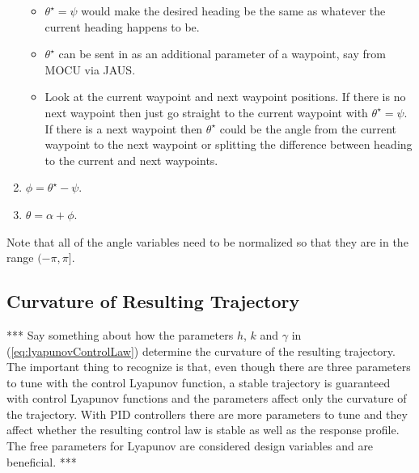 \begin{enumerate}
\begin{itemize}
\item $\theta^\star=\psi$ would make the desired heading be the same as whatever the current heading happens to be.
\item $\theta^\star$ can be sent in as an additional parameter of a waypoint, say from MOCU via JAUS.
\item Look at the current waypoint and next waypoint positions. If there is no next waypoint then just go straight to the current waypoint with $\theta^\star=\psi$. If there is a next waypoint then $\theta^\star$ could be the angle from the current waypoint to the next waypoint or splitting the difference between heading to the current and next waypoints.
\end{itemize}
\item $\phi=\theta^\star-\psi$.
\item $\theta=\alpha + \phi$.
\end{enumerate}
Note that all of the angle variables need to be normalized so that they are in the range $(-\pi,\pi]$.

\subsection{Curvature of Resulting Trajectory}
\label{sec:trajectoryCurvature}
*** Say something about how the parameters $h$, $k$ and $\gamma$ in (\ref{eq:lyapunovControlLaw}) determine the curvature of the resulting trajectory. The important thing to recognize is that, even though there are three parameters to tune with the control Lyapunov function, a stable trajectory is guaranteed with control Lyapunov functions and the parameters affect only the curvature of the trajectory. With PID controllers there are more parameters to tune and they affect whether the resulting control law is stable as well as the response profile. The free parameters for Lyapunov are considered design variables and are beneficial. ***
